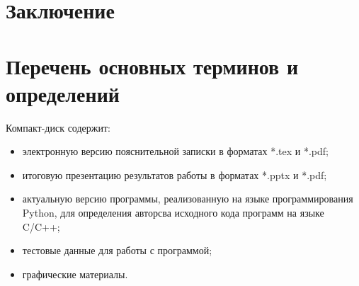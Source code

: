 \clearpage
{}


 
\newpage
\section*{Заключение}


\newpage
\section*{Перечень основных терминов и определений}

 
 
 \newpage
 \renewcommand{\refname}{Список использованных источников}
 

 Компакт-диск содержит: 
 \begin{itemize}
 \item электронную версию пояснительной записки в форматах *.tex и *.pdf;
 \item итоговую презентацию результатов работы в форматах *.pptx и *.pdf;
 \item актуальную версию программы, реализованную на языке программирования Python, для определения авторсва исходного кода программ на языке C/C++;
 \item тестовые данные для работы с программой;
 \item графические материалы.
 \end{itemize}
 
 \newpage
 


 



% 
% 
%  
% 


% 
% 
%  
% 
